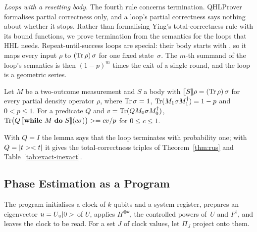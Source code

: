 \emph{Loops with a resetting body.} The fourth rule concerns termination. QHLProver formalises partial
correctness only, and a loop's partial correctness says nothing about whether it stops. Rather than
formalising Ying's total-correctness rule with its bound functions, we prove termination from the
semantics for the loops that HHL needs. Repeat-until-success
loops are special: their body starts with , so it maps every input $\rho$ to $(\operatorname{Tr}\rho)\,\sigma$
for one fixed state~$\sigma$. The $m$-th summand of the loop's semantics is then $(1-p)^m$ times the exit
of a single round, and the loop is a geometric series.

\begin{lemma}\label{lem:reset}
Let $M$ be a two-outcome measurement and $S$ a body with $\llbracket S\rrbracket\rho=(\operatorname{Tr}\rho)\,\sigma$ for every
partial density operator $\rho$, where $\operatorname{Tr}\sigma=1$, $\operatorname{Tr}(M_1\sigma M_1^\dagger)=1-p$ and $0<p\le1$.
For a predicate $Q$ and $v=\operatorname{Tr}(QM_0\sigma M_0^\dagger)$,
$\Tr\bigl(Q\,\sem{\mathbf{while}\ M\ \mathbf{do}\ S}(c\sigma)\bigr)\ge cv/p$ for $0\le c\le1$.
\end{lemma}

\noindent With $Q=I$ the lemma says that the loop terminates with probability one; with $Q=|t>< t|$
it gives the total-correctness triples of Theorem~\ref{thm:rus} and Table~\ref{tab:exact-inexact}.

\subsection{Phase Estimation as a Program}\label{sec:qpe-program}

The program  initialises a clock of $k$ qubits and a system register, prepares an
eigenvector $u=U_u|0>$ of $U$, applies $H^{\otimes k}$, the controlled powers of~$U$ and $F^\dagger$,
and leaves the clock to be read. For a set $J$ of clock values, let $\Pi_J$ project onto them.

